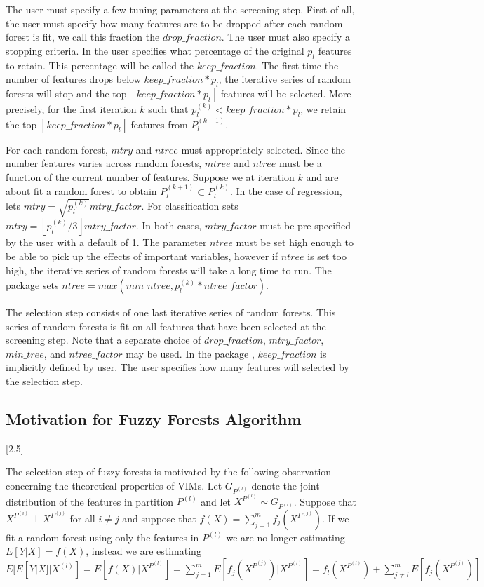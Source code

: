 \documentclass[article,shortnames]{jss}
\begin{document}
The user must specify a few tuning parameters at the screening step.  First of all, the user must specify how many features are to be dropped after 
each random forest is fit, we call this fraction the $drop\_fraction$.   The user must also specify a stopping criteria. 
In  the user specifies what percentage of the original $p_{l}$ features to retain.  This percentage will be called the $keep\_fraction$.  
The first time the number of features drops below $keep\_fraction*p_{l}$, the iterative series of random forests will stop and the top 
$\left\lfloor keep\_fraction*p_{l} \right\rfloor$ features will be selected.  More precisely, for the first iteration $k$ such that $p^{(k)}_{l}<keep\_fraction*p_{l}$, 
we retain the top $\left\lfloor keep\_fraction*p_{l} \right\rfloor$ features from $P_{l}^{(k-1)}$.         

For each random forest, $mtry$ and $ntree$ must appropriately selected.  Since the number features varies across random forests, $mtree$
and $ntree$ must be a function of the current number of features.   Suppose we at iteration $k$ and are about fit a random forest to obtain
$P_{l}^{(k+1)}\subset P_{l}^{(k)}$.  In the case of regression,  lets $mtry=\sqrt{p^{(k)}_{l}}mtry\_factor$.  For classification 
 sets $mtry=\left\lfloor p^{(k)}_{l}/3 \right\rfloor mtry\_factor$.  In both cases, $mtry\_factor$ must be pre-specified by the user
with a default of 1.  The parameter $ntree$ must be set high enough to be able to pick up the effects
of important variables, however if $ntree$ is set too high, the iterative series of random forests will take a long time to run.  The package  sets $ntree=max(min\_ntree,p^{(k)}_{l}*ntree\_factor)$.
   
The selection step consists of one last iterative series of random forests. This series of random forests is fit on all features that have
been selected at the screening step.  Note that a separate choice of $drop\_fraction$, $mtry\_factor$, $min\_tree$,
and $ntree\_factor$ may be used.  In the package , $keep\_fraction$ is implicitly defined by user.  The user specifies 
how many features will selected by the selection step.  

\subsection{Motivation for Fuzzy Forests Algorithm}[2.5]

The selection step of fuzzy forests is motivated by the following observation concerning the theoretical properties of VIMs. 
Let $G_{P^{(l)}}$ denote the joint distribution of the features in partition $P^{(l)}$ and let $X^{P^{(l)}} \sim G_{P^{(l)}}$.
Suppose that $X^{P^{(i)}} \perp X^{P^{(j)}}$ for all $i\neq j$ and suppose that $f(X)=\sum_{j=1}^{m}f_{j}(X^{P^{(j)}})$.  If we fit
a random forest using only the features in $P^{(l)}$ we are no longer estimating $E[Y|X]=f(X)$, instead we are estimating
 $E[E[Y|X]|X^{(l)}]=E[f(X)|X^{P^{(l)}}]=\sum_{j=1}^{m}E[f_{j}(X^{P^{(j)}})|X^{P^{(l)}}]=f_{l}(X^{P^{(l)}}) + \sum_{j\neq l}^{m}E[f_{j}(X^{P^{(j)}})]$
\end{document}
